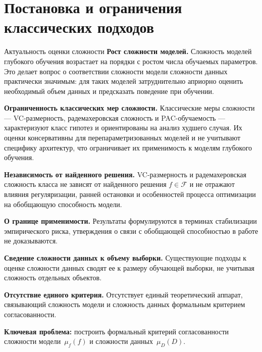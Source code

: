 \documentclass[9pt,pdf,hyperref={unicode}]{beamer}
\begin{document}
\section{Постановка и ограничения классических подходов}
\begin{frame}{Актуальность оценки сложности}
\justifying
\small
\textbf{Рост сложности моделей.} Сложность моделей глубокого обучения возрастает на порядки с ростом числа обучаемых параметров. Это делает вопрос о соответствии сложности модели сложности данных практически значимым: для таких моделей затруднительно априорно оценить необходимый объем данных и предсказать поведение при обучении.

\textbf{Ограниченность классических мер сложности.} Классические меры сложности --- VC-размерность, радемахеровская сложность и PAC-обучаемость --- характеризуют класс гипотез и ориентированы на анализ худшего случая. Их оценки консервативны для перепараметризованных моделей и не учитывают специфику архитектур, что ограничивает их применимость к моделям глубокого обучения.

\textbf{Независимость от найденного решения.} VC-размерность и радемахеровская сложность класса не зависят от найденного решения $f\in\mathcal{F}$ и не отражают влияния регуляризации, ранней остановки и особенностей процесса оптимизации на обобщающую способность модели.

\textbf{О границе применимости.} Результаты формулируются в терминах стабилизации эмпирического риска, утверждения о связи с обобщающей способностью в работе не доказываются.

\textbf{Сведение сложности данных к объему выборки.} Существующие подходы к оценке сложности данных сводят ее к размеру обучающей выборки, не учитывая сложность отдельных объектов.

\textbf{Отсутствие единого критерия.} Отсутствует единый теоретический аппарат, связывающий сложность модели и сложность данных формальным критерием согласованности.

\vspace{0.15cm}
\textbf{Ключевая проблема:} построить формальный критерий согласованности сложности модели~$\mu_f(f)$ и сложности данных~$\mu_D(D)$.
\end{frame}
\end{document}
